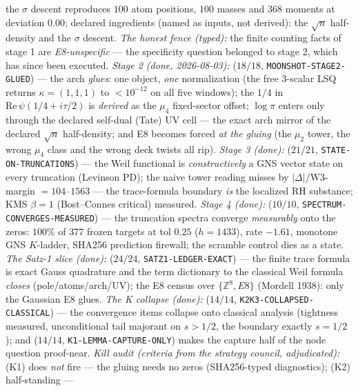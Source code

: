 the $\sigma$ descent reproduces $100$ atom positions, $100$ masses
and $368$ moments at deviation $0.00$; declared ingredients (named
as inputs, not derived): the $\sqrt{n}$ half-density and the
$\sigma$ descent.  \emph{The honest fence (typed):} the finite
counting facts of stage 1 are \emph{E8-unspecific} --- the
specificity question belonged to stage 2, which has since been
executed.  \emph{Stage 2 (done, 2026-08-03):}
 ($18/18$,
\texttt{MOONSHOT-STAGE2-GLUED}) --- the arch \emph{glues}: one
object, \emph{one} normalization (the free 3-scalar LSQ returns
$\kappa=(1,1,1)$ to $<10^{-12}$ on all five windows); the $1/4$ in
$\mathrm{Re}\,\psi(1/4+i\tau/2)$ is \emph{derived} as the $\mu_4$
fixed-sector offset; $\log\pi$ enters only through the declared
self-dual (Tate) UV cell --- the exact arch mirror of the declared
$\sqrt{n}$ half-density; and E8 becomes forced \emph{at the gluing}
(the $\mu_2$ tower, the wrong $\mu_4$ class and the wrong deck
twists all rip).  \emph{Stage 3 (done):}
 ($21/21$,
\texttt{STATE-ON-TRUNCATIONS}) --- the Weil functional is
\emph{constructively} a GNS vector state on every truncation
(Levinson PD); the naive tower reading misses by
$|\Delta|/\mathrm{W3}$-margin $=104$--$1563$ --- the trace-formula
boundary \emph{is} the localized RH substance; KMS $\beta=1$
(Bost--Connes critical) measured.  \emph{Stage 4 (done):}
 ($10/10$,
\texttt{SPECTRUM-CONVERGES-MEASURED}) --- the truncation spectra
converge \emph{measurably} onto the zeros: $100\%$ of $377$ frozen
targets at tol $0.25$ ($h=1433$), rate $-1.61$, monotone GNS
$K$-ladder, SHA256 prediction firewall; the scramble control dies
as a state.  \emph{The Satz-1 slice (done):}
 ($24/24$,
\texttt{SATZ1-LEDGER-EXACT}) --- the finite trace formula is exact
Gauss quadrature and the term dictionary to the classical Weil
formula \emph{closes} (pole/atoms/arch/UV); the E8 census over
$\{\mathbb{Z}^8, E8\}$ (Mordell 1938): only the Gaussian E8 glues.
\emph{The K collapse (done):} 
($14/14$, \texttt{K2K3-COLLAPSED-CLASSICAL}) --- the convergence
items collapse onto classical analysis (tightness measured,
unconditional tail majorant on $s>1/2$, the boundary exactly
$s=1/2$); and  ($14/14$,
\texttt{K1-LEMMA-CAPTURE-ONLY}) makes the capture half of the node
question proof-near.  \emph{Kill audit (criteria from the strategy
council, adjudicated):} (K1) does \emph{not} fire --- the gluing
needs no zeros (SHA256-typed diagnostics); (K2) half-standing ---
